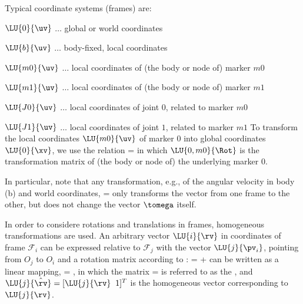 Typical coordinate systems (frames) are:
\bi
  \item $\LU{0}{\uv}$ $\ldots$ global or world coordinates
  \item $\LU{b}{\uv}$ $\ldots$ body-fixed, local coordinates
  \item $\LU{m0}{\uv}$ $\ldots$ local coordinates of (the body or node of) marker $m0$
  \item $\LU{m1}{\uv}$ $\ldots$ local coordinates of (the body or node of) marker $m1$
  \item $\LU{J0}{\uv}$ $\ldots$ local coordinates of joint $0$, related to marker $m0$
  \item $\LU{J1}{\uv}$ $\ldots$ local coordinates of joint $1$, related to marker $m1$
\ei
To transform the local coordinates $\LU{m0}{\uv}$ of marker 0 into global coordinates $\LU{0}{\xv}$, we use the relation
\be \label{eq:theory:coordinateSystems:rot}
   =  
\ee
in which $\LU{0,m0}{\Rot}$ is the transformation matrix of (the body or node of) the underlying marker 0.

In particular, note that any transformation, e.g., of the angular velocity in body (b) and world coordinates,
\be
   =  
\ee
only transforms the vector from one frame to the other, but does not change the vector $\tomega$ itself.



In order to considere rotations and translations in frames, homogeneous transformations are used.
An arbitrary vector $\LU{i}{\rv}$ in coordinates of frame $\mathcal{F}_i$ can be expressed relative to $\mathcal{F}_j$ with the vector $\LU{j}{\pv_i}$, pointing from $O_j$ to $O_i$ and a rotation matrix according to :
\be \label{eq:theory:HT:positionRelation}
   =   + 
\ee
{} can be written as a linear mapping,
\be
   =  , \quad
\ee
in which the matrix
\be
   =  
\ee
is referred to as the , and $\LU{j}{\hat \rv} = [\LU{j}{\rv} \;\; 1]^T$ is the homogeneous vector corresponding to $\LU{j}{\rv}$.


